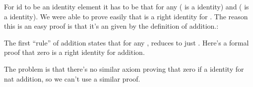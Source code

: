 \documentclass[letterpaper,10pt,english]{sphinxmanual}
\begin{document}
\sphinxAtStartPar
For id to be an identity element it has to be that for
any  ( is a  identity)
and  ( is a  identity). We were
able to prove easily that  is a right identity for
. The reason this is an easy proof is that it’s
an  given by the definition of addition.:

\begin{sphinxVerbatim}[commandchars=\\\{\}]
       
           
           
\end{sphinxVerbatim}

\sphinxAtStartPar
The first “rule” of addition states that for any ,
 reduces to just .  Here’s a formal proof
that zero is a right identity for addition.

\begin{sphinxVerbatim}[commandchars=\\\{\}]
            
 
  \PYG{o}{[}\PYG{o}{]}
\end{sphinxVerbatim}

\sphinxAtStartPar
The problem is that there’s no similar axiom proving
that zero if a  identity for nat addition, so
we can’t use a similar proof.

\begin{sphinxVerbatim}[commandchars=\\\{\}]
           
 
 \PYG{o}{[}\PYG{o}{]}   
\end{sphinxVerbatim}
\end{document}

